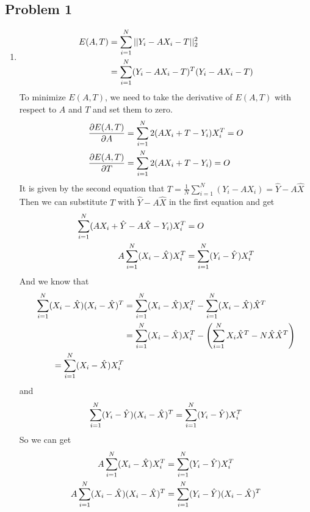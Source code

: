 \documentclass[bwprint]{gmcmthesis}
\numberwithin{figure}{section}
\begin{document}
\subsection{Problem 1}
\begin{enumerate}[label=\alph*.]
    \item 
    \begin{align}
        E(A, T) &= \sum_{i=1}^{N}||Y_i - AX_i - T||_2^2 \notag \\
                &= \sum_{i=1}^{N}(Y_i - AX_i - T)^T(Y_i - AX_i - T) \notag
    \end{align}
    To minimize $E(A, T)$, we need to take the derivative of $E(A, T)$ with respect to $A$ and $T$ and set them to zero.
    \begin{align}
        \frac{\partial E(A, T)}{\partial A} &= \sum_{i=1}^{N}2(AX_i + T - Y_i)X_i^T = O \notag \\
        \frac{\partial E(A, T)}{\partial T} &= \sum_{i=1}^{N}2(AX_i + T - Y_i) = O \notag
    \end{align}
    It is given by the second equation that $T = \frac{1}{N}\sum_{i=1}^{N}(Y_i-AX_i) = \hat{Y} - A\hat{X}$
    Then we can substitute $T$ with $\hat{Y} - A\hat{X}$ in the first equation and get 
    \begin{align}
        \sum_{i=1}^{N}(AX_i + \hat{Y} - A\hat{X} - Y_i)X_i^T &= O \notag \\
        A\sum_{i=1}^{N}(X_i - \hat{X})X_i^T &= \sum_{i=1}^{N}(Y_i - \hat{Y})X_i^T \notag
    \end{align}
    And we know that
    \begin{align}
        \sum_{i=1}^{N}(X_i - \hat{X})(X_i - \hat{X})^T &= \sum_{i=1}^{N}(X_i - \hat{X})X_i^T - \sum_{i=1}^{N}(X_i - \hat{X})\hat{X}^T \notag \\
        &= \sum_{i=1}^{N}(X_i - \hat{X})X_i^T - \left(\sum_{i=1}^{N}X_i\hat{X}^T - N\hat{X}\hat{X}^T\right) \notag \\
        = \sum_{i=1}^{N}(X_i - \hat{X})X_i^T \notag
    \end{align}
    and
    \begin{align}
        \sum_{i=1}^{N}(Y_i - \hat{Y})(X_i - \hat{X})^T = \sum_{i=1}^{N}(Y_i - \hat{Y})X_i^T \notag
    \end{align}
    So we can get
    \begin{align}
        A\sum_{i=1}^{N}(X_i - \hat{X})X_i^T &= \sum_{i=1}^{N}(Y_i - \hat{Y})X_i^T \notag \\
        A\sum_{i=1}^{N}(X_i - \hat{X})(X_i - \hat{X})^T &= \sum_{i=1}^{N}(Y_i - \hat{Y})(X_i - \hat{X})^T \notag \\

\end{align}
\end{enumerate}
\end{document}
